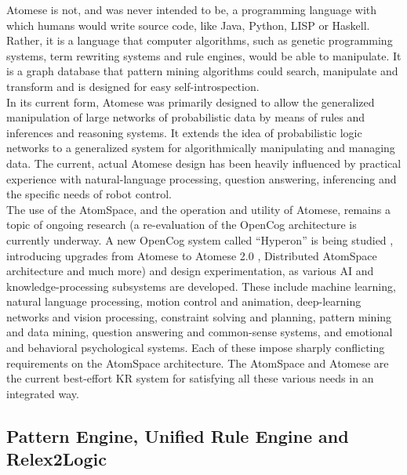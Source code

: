 Atomese is not, and was never intended to be, a programming language with which humans would write source code, like Java, Python, LISP or Haskell. 
Rather, it is a language that computer algorithms, such as genetic programming systems, term rewriting systems and rule engines, would be able to manipulate. 
It is a graph database that pattern mining algorithms could search, manipulate and transform and is designed for easy self-introspection. \\

In its current form, Atomese was primarily designed to allow the generalized manipulation of large networks of probabilistic data by means of rules and inferences and reasoning systems. It extends the idea of probabilistic logic networks to a generalized system for algorithmically manipulating and managing data. The current, actual Atomese design has been heavily influenced by practical experience with natural-language processing, question answering, inferencing and the specific needs of robot control. \\



The use of the AtomSpace, and the operation and utility of Atomese, remains a topic of ongoing research (a re-evaluation of the OpenCog architecture is currently underway. A new OpenCog system called \enquote{Hyperon} is being studied \cite{goertzel_potapov_senna_singularitynet-opencog_team_2020}, introducing upgrades from Atomese to Atomese 2.0 \cite{DBLP:journals/corr/abs-2004-05267}, Distributed AtomSpace architecture \cite{distributed_2017, senna_2018, potapov_2020_1, potapov_2020_2} and much more) and design experimentation, as various AI and knowledge-processing subsystems are developed. These include machine learning, natural language processing, motion control and animation, deep-learning networks and vision processing, constraint solving and planning, pattern mining and data mining, question answering and common-sense systems, and emotional and behavioral psychological systems. Each of these impose sharply conflicting requirements on the AtomSpace architecture. The AtomSpace and Atomese are the current best-effort KR system for satisfying all these various needs in an integrated way.

\subsection{Pattern Engine, Unified Rule Engine and Relex2Logic}\label{sec:pattern_ur_engine}

